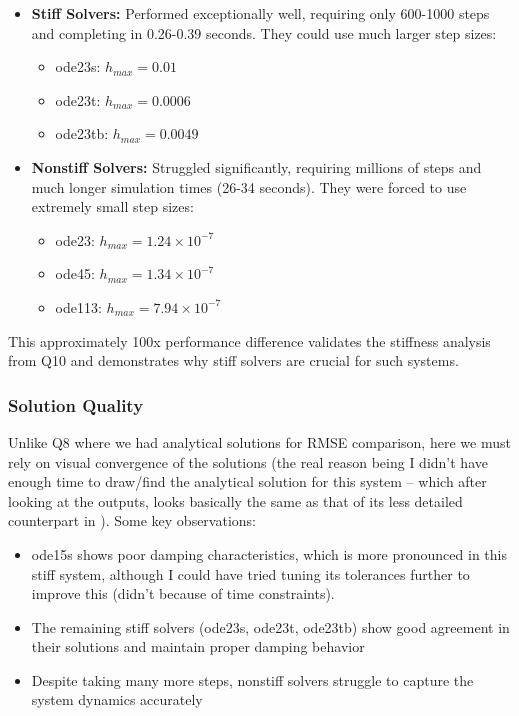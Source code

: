 \begin{itemize}
    \item \textbf{Stiff Solvers:} Performed exceptionally well, requiring only 600-1000 steps and completing in 0.26-0.39 seconds. They could use much larger step sizes:
    \begin{itemize}
        \item ode23s: $h_{max} = 0.01$
        \item ode23t: $h_{max} = 0.0006$
        \item ode23tb: $h_{max} = 0.0049$
    \end{itemize}
    
    \item \textbf{Nonstiff Solvers:} Struggled significantly, requiring millions of steps and much longer simulation times (26-34 seconds). They were forced to use extremely small step sizes:
    \begin{itemize}
        \item ode23: $h_{max} = 1.24 \times 10^{-7}$
        \item ode45: $h_{max} = 1.34 \times 10^{-7}$
        \item ode113: $h_{max} = 7.94 \times 10^{-7}$
    \end{itemize}
\end{itemize}

This approximately 100x performance difference validates the stiffness analysis from Q10 and demonstrates why stiff solvers are crucial for such systems.

\subsubsection*{Solution Quality}
Unlike Q8 where we had analytical solutions for RMSE comparison, here we must rely on visual convergence of the solutions (the real reason being I didn't have enough time to draw/find the analytical solution for this system -- which after looking at the outputs, looks basically the same as that of its less detailed counterpart in ). Some key observations:

\begin{itemize}
    \item ode15s shows poor damping characteristics, which is more pronounced in this stiff system, although I could have tried tuning its tolerances further to improve this (didn't because of time constraints).
    \item The remaining stiff solvers (ode23s, ode23t, ode23tb) show good agreement in their solutions and maintain proper damping behavior
    \item Despite taking many more steps, nonstiff solvers struggle to capture the system dynamics accurately
\end{itemize}

